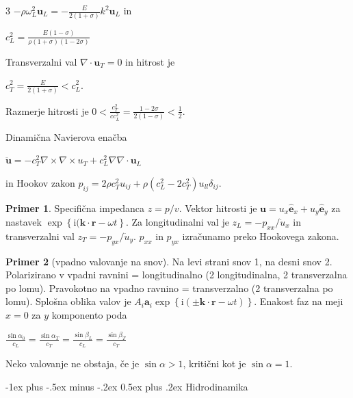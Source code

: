 \documentclass[10pt,landscape]{article}
\makeatletter
\renewcommand{\section}{\@startsection{section}{1}{0mm}%
	{-1ex plus -.5ex minus -.2ex}%
	{0.5ex plus .2ex}%
	{\normalfont\large\bfseries}}
\theoremstyle{definition}
\newtheorem*{primer}{Primer}
\makeatother
\begin{document}
\begin{multicols}{3}
  \( - \rho \omega_L ^2 \mathbf{u}_L = - \frac{E}{2(1 + \sigma)} k ^2 \mathbf{u}_L  \) in

  \( c_L ^2 = \frac{E (1 - \sigma)}{\rho (1 + \sigma) (1 - 2 \sigma)} \)

  Transverzalni val  \( \nabla \cdot \mathbf{u}_T = 0 \) in hitrost je

  \( c_T ^2 = \frac{E}{2 (1 + \sigma)} < c_L ^2 \).

  Razmerje hitrosti je \( 0 < \frac{c_T ^2}{cc_L ^2} = \frac{1 - 2 \sigma}{2 (1 - \sigma)} < \frac{1}{2} \). 

  Dinamična Navierova enačba

  \( \ddot{\mathbf{u}} = - c_T ^2 \nabla \times \nabla \times u_T + c_L ^2 \nabla \nabla \cdot \mathbf{u}_L \)

  in Hookov zakon \( p_{ij} = 2 \rho c_T ^2 u_{ij} + \rho \left( c_L ^2 - 2 c_T ^2 \right)u_{ll} \delta_{ij} \). 

  \begin{primer}
    Specifična impedanca \( z = p / v \). Vektor hitrosti je \( \mathbf{u} = u_x \hat{\mathbf{e}}_x + u_y \hat{\mathbf{e}}_y \) za nastavek \( \exp \left\{ \mathrm{i} (\mathbf{k} \cdot \mathbf{r} - \omega t \right\} \). Za longitudinalni val je \( z_L = - p_{xx} / \dot{u}_x \) in transverzalni val \( z_T = - p_{yx} / \dot{u}_y \). \( p_{xx} \) in \( p_{yx} \) izračunamo preko Hookovega zakona.
  \end{primer}

  \begin{primer}[vpadno valovanje na snov]
    Na levi strani snov 1, na desni snov 2. Polarizirano v vpadni ravnini = longitudinalno (2 longitudinalna, 2 transverzalna po lomu). Pravokotno na vpadno ravnino = transverzalno (2 transverzalna po lomu). Splošna oblika valov je \( A_i \mathbf{a}_i \exp \left\{ \mathrm{i} (\pm \mathbf{k} \cdot \mathbf{r} - \omega t)  \right\} \). Enakost faz na meji \( x = 0 \) za \( y \) komponento poda

    \( \frac{\sin \alpha_0}{c_L} = \frac{\sin \alpha_T}{c_T} = \frac{\sin \beta_L}{c_L} = \frac{\sin \beta_T}{c_T} \)

    Neko valovanje ne obstaja, če je \( \sin \alpha > 1 \), kritični kot je \( \sin \alpha = 1 \).
  \end{primer}
  
  \section{Hidrodinamika}


\end{multicols}
\end{document}

